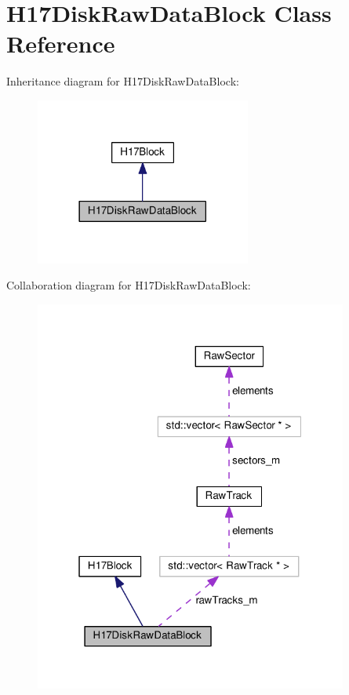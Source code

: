 \hypertarget{classH17DiskRawDataBlock}{}\section{H17\+Disk\+Raw\+Data\+Block Class Reference}
\label{classH17DiskRawDataBlock}


Inheritance diagram for H17\+Disk\+Raw\+Data\+Block\+:\nopagebreak
\begin{figure}[H]
\begin{center}
\leavevmode
\includegraphics[width=201pt]{classH17DiskRawDataBlock__inherit__graph}
\end{center}
\end{figure}


Collaboration diagram for H17\+Disk\+Raw\+Data\+Block\+:\nopagebreak
\begin{figure}[H]
\begin{center}
\leavevmode
\includegraphics[width=292pt]{classH17DiskRawDataBlock__coll__graph}
\end{center}
\end{figure}
